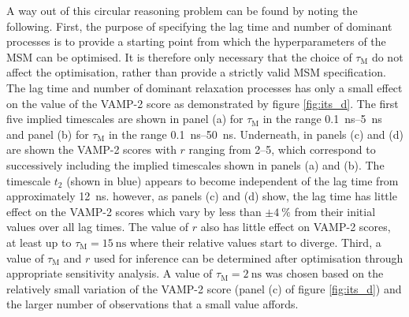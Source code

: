A way out of this circular reasoning problem can be found by noting the following. First, the purpose of specifying the lag time and number of dominant processes is to provide a starting point from which the hyperparameters of the MSM can be optimised. It is therefore only necessary that the choice of $\tau_{\mathrm{M}}$ do not affect the optimisation, rather than provide a strictly valid MSM specification. The lag time and number of dominant relaxation processes has only a small effect on the value of the VAMP-2 score as demonstrated by figure \ref{fig:its_d}. The first five implied timescales are shown in panel (a)  for $\tau_{\mathrm{M}}$ in the range \SIrange{0.1}{5}{\nano\second} and panel (b) for $\tau_{\mathrm{M}}$ in the range \SIrange{0.1}{50}{\nano\second}. Underneath, in panels (c) and (d) are shown the VAMP-2 scores with $r$ ranging from \numrange{2}{5}, which correspond to successively including the implied timescales shown in panels (a) and (b). The timescale $t_{2}$ (shown in blue) appears to become independent of the lag time from approximately \SI{12}{\nano\second}. however, as panels (c) and (d) show, the lag time has little effect on the VAMP-2 scores which vary by less than $\pm\SI{4}{\percent}$ from their initial values over all lag times. The value of $r$ also has little effect on VAMP-2 scores, at least up to $\tau_{\mathrm{M}}=\SI{15}{\nano\second}$ where their relative values start to diverge. Third, a value of $\tau_{\mathrm{M}}$ and $r$ used for inference can be determined after optimisation through appropriate sensitivity analysis. A value of $\tau_{\mathrm{M}}=\SI{2}{\nano\second}$ was chosen based on the relatively small variation of the VAMP-2 score (panel (c) of figure \ref{fig:its_d}) and the larger number of observations that a small value affords. 

